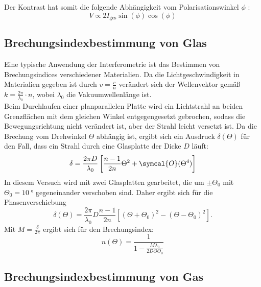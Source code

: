 \noindent Der Kontrast hat somit die folgende Abhängigkeit vom Polarisationswinkel $\phi$ :
\begin{equation}
    V \propto 2 I_{\text{ges}} \sin(\phi)\cos(\phi) \label{eqn:kontrastphi}
\end{equation}


\subsection{Brechungsindexbestimmung von Glas}

\noindent Eine typische Anwendung der Interferometrie ist das Bestimmen von Brechungsindices verschiedener Materialien. Da die Lichtgeschwindigkeit in Materialien gegeben ist durch
$ v = \frac{c}{n}$ verändert sich der Wellenvektor gemäß $ k = \frac{2 \pi}{\lambda_0} \cdot n$, wobei $\lambda_0$ die Vakuumwellenlänge ist. \\
Beim Durchlaufen einer planparallelen Platte wird ein Lichtstrahl an beiden Grenzflächen mit dem gleichen Winkel entgegengesetzt gebrochen, sodass die Bewegungsrichtung nicht
verändert ist, aber der Strahl leicht versetzt ist. Da die Brechung vom Drehwinkel $\Theta$ abhängig ist, ergibt sich ein Ausdruck $\delta(\Theta)$ für den Fall, dass ein Strahl durch 
eine Glasplatte der Dicke $D$ läuft:
\begin{equation*}
    \delta = \frac{2 \pi D}{\lambda_0} \left[ \frac{n-1}{2n} \Theta^2 + \symcal{O}(\Theta ^4)\right]
\end{equation*}
In diesem Versuch wird mit zwei Glasplatten gearbeitet, die um $ \pm \Theta_0$ mit $\Theta_0 = \SI{10}{\degree}$ gegeneinander verschoben sind. Daher ergibt 
sich für die Phasenverschiebung 
\begin{equation*}
    \delta(\Theta) = \frac{2 \pi}{\lambda_0} D \frac{n-1}{2n} \left[ (\Theta + \Theta_0)^2 - (\Theta - \Theta_0)^2 \right]. 
\end{equation*}
Mit $ M = \frac{\delta}{2 \pi} $ ergibt sich für den Brechungsindex:
\begin{equation}
    n(\Theta) = \frac{1}{1 - \frac{M \lambda_0}{2 D \Theta \Theta_0}}
    \label{eqn:n_Glas}
\end{equation}

\subsection{Brechungsindexbestimmung von Gas}


